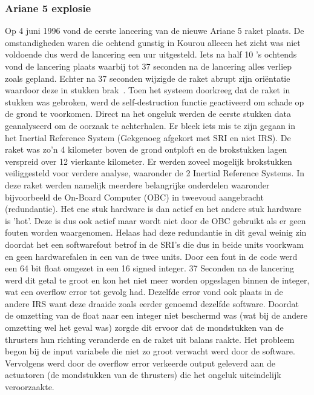 \documentclass{article}
\begin{document}
\subsubsection{Ariane 5 explosie}
Op 4 juni 1996 vond de eerste lancering van de nieuwe Ariane 5 raket plaats. De omstandigheden waren die ochtend gunstig in Kourou alleeen het zicht was niet voldoende dus werd de lancering een uur uitgesteld. Iets na half 10 's ochtends vond de lancering plaats waarbij tot 37 seconden na de lancering alles verliep zoals gepland. Echter na 37 seconden wijzigde de raket abrupt zijn oriëntatie waardoor deze in stukken brak~\cite{ariane5}. Toen het systeem doorkreeg dat de raket in stukken was gebroken, werd de self-destruction functie geactiveerd om schade op de grond te voorkomen. Direct na het ongeluk werden de eerste stukken data geanalyseerd om de oorzaak te achterhalen. Er bleek iets mis te zijn gegaan in het Inertial Reference System (Gekgenoeg afgekort met SRI en niet IRS). De raket was zo'n 4 kilometer boven de grond ontploft en de brokstukken lagen verspreid over 12 vierkante kilometer. Er werden zoveel mogelijk brokstukken veiliggesteld voor verdere analyse, waaronder de 2 Inertial Reference Systems. In deze raket werden namelijk meerdere belangrijke onderdelen waaronder bijvoorbeeld de On-Board Computer (OBC) in tweevoud aangebracht (redundantie). Het ene stuk hardware is dan actief en het andere stuk hardware is 'hot'. Deze is dus ook actief maar wordt niet door de OBC gebruikt als er geen fouten worden waargenomen. Helaas had deze redundantie in dit geval weinig zin doordat het een softwarefout betrof in de SRI's die dus in beide units voorkwam en geen hardwarefalen in een van de twee units. Door een fout in de code werd een 64 bit float omgezet in een 16 signed integer. 37 Seconden na de lancering werd dit getal te groot en kon het niet meer worden opgeslagen binnen de integer, wat een overflow error tot gevolg had. Dezelfde error vond ook plaats in de andere IRS want deze draaide zoals eerder genoemd dezelfde software. Doordat de omzetting van de float naar een integer niet beschermd was (wat bij de andere omzetting wel het geval was) zorgde dit ervoor dat de mondstukken van de thrusters hun richting veranderde en de raket uit balans raakte. Het probleem begon bij de input variabele die niet zo groot verwacht werd door de software. Vervolgens werd door de overflow error verkeerde output geleverd aan de actuatoren (de mondstukken van de thrusters) die het ongeluk uiteindelijk veroorzaakte. 
\end{document}

